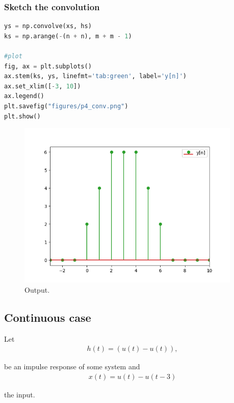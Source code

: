 \subsubsection*{Sketch the convolution}
\begin{lstlisting}[language=python]
ys = np.convolve(xs, hs)
ks = np.arange(-(n + n), m + m - 1)

#plot 
fig, ax = plt.subplots()
ax.stem(ks, ys, linefmt='tab:green', label='y[n]')
ax.set_xlim([-3, 10])
ax.legend()
plt.savefig("figures/p4_conv.png")
plt.show()
\end{lstlisting}
\clearpage

\begin{figure}[h!]
    \begin{center}
        \includegraphics[width=0.95\textwidth]{figures/p4_conv.png}
    \end{center}
    \caption{Output.}
\end{figure}

\subsection*{Continuous case}
Let 
\begin{align}
    h(t) = (u(t) - u(t)),
\end{align}

be an impulse response of some system and 
\begin{align}
    x(t) = u(t) - u(t-3)
\end{align}

the input.
